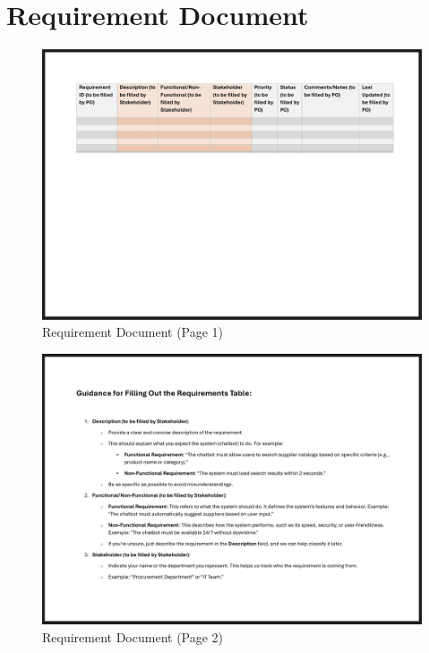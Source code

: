 \section{Requirement Document}\label{sec:requirement-document}
\begin{figure}[H]
    \centering
    \caption[]{Requirement Document (Page 1)}
    \label{fig:requirement-document-1}
    \includegraphics[width=1\textwidth]{abbildungen/RE/Word/RequirementDocument1}
\end{figure}
\begin{figure}[H]
    \centering
    \caption[]{Requirement Document (Page 2)}
    \label{fig:requirement-document-2}
    \includegraphics[width=1\textwidth]{abbildungen/RE/Word/RequirementDocument2}
\end{figure}
